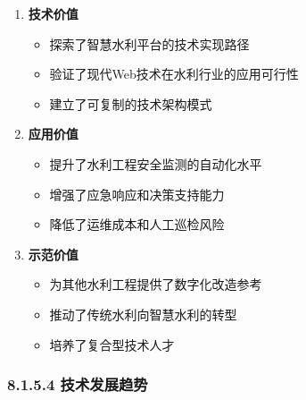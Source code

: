 \begin{enumerate}
\def\labelenumi{\arabic{enumi}.}
\tightlist
\item
  \textbf{技术价值}

  \begin{itemize}
  \tightlist
  \item
    探索了智慧水利平台的技术实现路径
  \item
    验证了现代Web技术在水利行业的应用可行性
  \item
    建立了可复制的技术架构模式
  \end{itemize}
\item
  \textbf{应用价值}

  \begin{itemize}
  \tightlist
  \item
    提升了水利工程安全监测的自动化水平
  \item
    增强了应急响应和决策支持能力
  \item
    降低了运维成本和人工巡检风险
  \end{itemize}
\item
  \textbf{示范价值}

  \begin{itemize}
  \tightlist
  \item
    为其他水利工程提供了数字化改造参考
  \item
    推动了传统水利向智慧水利的转型
  \item
    培养了复合型技术人才
  \end{itemize}
\end{enumerate}

\subsubsection{8.1.5.4
技术发展趋势}\label{ux6280ux672fux53d1ux5c55ux8d8bux52bf}

